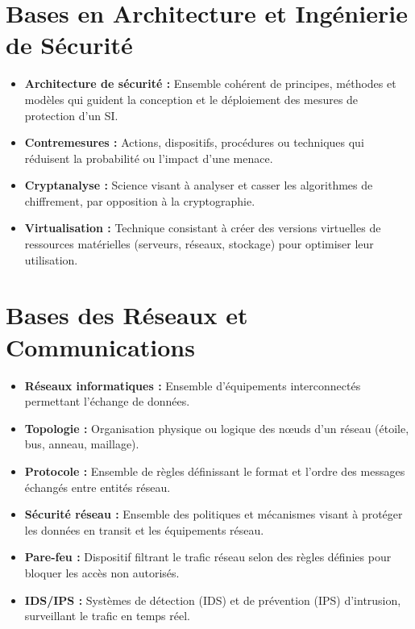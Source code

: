 \section{Bases en Architecture et Ingénierie de Sécurité}

\begin{itemize}
    \item \textbf{Architecture de sécurité :} Ensemble cohérent de principes, méthodes et modèles qui guident la conception et le déploiement des mesures de protection d'un SI.
    \item \textbf{Contremesures :} Actions, dispositifs, procédures ou techniques qui réduisent la probabilité ou l'impact d'une menace.
    \item \textbf{Cryptanalyse :} Science visant à analyser et casser les algorithmes de chiffrement, par opposition à la cryptographie.
    \item \textbf{Virtualisation :} Technique consistant à créer des versions virtuelles de ressources matérielles (serveurs, réseaux, stockage) pour optimiser leur utilisation.
\end{itemize}

\section{Bases des Réseaux et Communications}

\begin{itemize}
    \item \textbf{Réseaux informatiques :} Ensemble d'équipements interconnectés permettant l'échange de données.
    \item \textbf{Topologie :} Organisation physique ou logique des nœuds d'un réseau (étoile, bus, anneau, maillage).
    \item \textbf{Protocole :} Ensemble de règles définissant le format et l'ordre des messages échangés entre entités réseau.
    \item \textbf{Sécurité réseau :} Ensemble des politiques et mécanismes visant à protéger les données en transit et les équipements réseau.
    \item \textbf{Pare-feu :} Dispositif filtrant le trafic réseau selon des règles définies pour bloquer les accès non autorisés.
    \item \textbf{IDS/IPS :} Systèmes de détection (IDS) et de prévention (IPS) d'intrusion, surveillant le trafic en temps réel.
\end{itemize}

